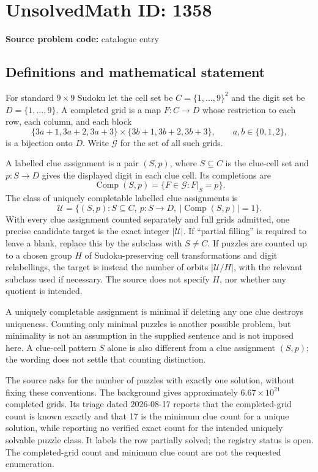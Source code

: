 \documentclass[11pt]{article}
\begin{document}
\section*{UnsolvedMath ID: 1358}
\textbf{Source problem code:} catalogue entry
\subsection{Definitions and mathematical statement}
For standard \(9\times9\) Sudoku let the cell set be \(C=\{1,\ldots,9\}^2\) and the digit set be \(D=\{1,\ldots,9\}\). A completed grid is a map \(F:C\to D\) whose restriction to each row, each column, and each block
\[
\{3a+1,3a+2,3a+3\}\times\{3b+1,3b+2,3b+3\},
\qquad a,b\in\{0,1,2\},
\]
is a bijection onto \(D\). Write \(\mathcal G\) for the set of all such grids.

A labelled clue assignment is a pair \((S,p)\), where \(S\subseteq C\) is the clue-cell set and \(p:S\to D\) gives the displayed digit in each clue cell. Its completions are
\[
\operatorname{Comp}(S,p)=\{F\in\mathcal G:F|_S=p\}.
\]
The class of uniquely completable labelled clue assignments is
\[
\mathcal U=\{(S,p):S\subseteq C,\ p:S\to D,\ |\operatorname{Comp}(S,p)|=1\}.
\]
With every clue assignment counted separately and full grids admitted, one precise candidate target is the exact integer \(|\mathcal U|\). If ``partial filling'' is required to leave a blank, replace this by the subclass with \(S\ne C\). If puzzles are counted up to a chosen group \(H\) of Sudoku-preserving cell transformations and digit relabellings, the target is instead the number of orbits \(|\mathcal U/H|\), with the relevant subclass used if necessary. The source does not specify \(H\), nor whether any quotient is intended.

A uniquely completable assignment is minimal if deleting any one clue destroys uniqueness. Counting only minimal puzzles is another possible problem, but minimality is not an assumption in the supplied sentence and is not imposed here. A clue-cell pattern \(S\) alone is also different from a clue assignment \((S,p)\); the wording does not settle that counting distinction.

The source asks for the number of puzzles with exactly one solution, without fixing these conventions. The background gives approximately \(6.67\times10^{21}\) completed grids. Its triage dated 2026-08-17 reports that the completed-grid count is known exactly and that 17 is the minimum clue count for a unique solution, while reporting no verified exact count for the intended uniquely solvable puzzle class. It labels the row partially solved; the registry status is open. The completed-grid count and minimum clue count are not the requested enumeration.
\end{document}
